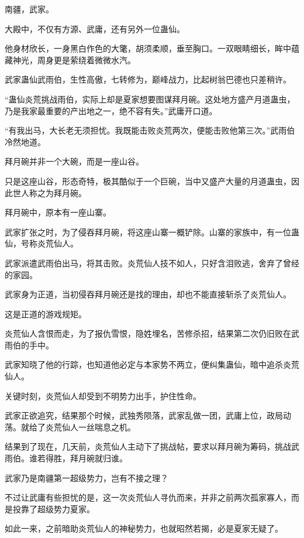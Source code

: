 
\begin{this_body}

南疆，武家。

大殿中，不仅有方源、武庸，还有另外一位蛊仙。

他身材欣长，一身黑白作色的大氅，胡须柔顺，垂至胸口。一双眼睛细长，眸中蕴藏神光，周身更是萦绕着微微水汽。

武家蛊仙武雨伯，生性高傲，七转修为，巅峰战力，比起树翁巴德也只差稍许。

“蛊仙炎荒挑战雨伯，实际上却是夏家想要图谋拜月碗。这处地方盛产月道蛊虫，乃是我家最重要的产出地之一，绝不容有失。”武庸开口道。

“有我出马，大长老无须担忧。我既能击败炎荒两次，便能击败他第三次。”武雨伯冷然地道。

拜月碗并非一个大碗，而是一座山谷。

只是这座山谷，形态奇特，极其酷似于一个巨碗，当中又盛产大量的月道蛊虫，因此世人称之为拜月碗。

拜月碗中，原本有一座山寨。

武家扩张之时，为了侵吞拜月碗，将这座山寨一概铲除。山寨的家族中，有一位蛊仙，号称炎荒仙人。

武家派遣武雨伯出马，将其击败。炎荒仙人技不如人，只好含泪败逃，舍弃了曾经的家园。

武家身为正道，当初侵吞拜月碗还是找的理由，却也不能直接斩杀了炎荒仙人。

这是正道的游戏规矩。

炎荒仙人含恨而走，为了报仇雪恨，隐姓埋名，苦修杀招，结果第二次仍旧败在武雨伯的手中。

武家知晓了他的行踪，也知道他必定与本家势不两立，便纠集蛊仙，暗中追杀炎荒仙人。

关键时刻，炎荒仙人却受到不明势力出手，护住性命。

武家正欲追究，结果那个时候，武独秀陨落，武家乱做一团，武庸上位，政局动荡。就给了炎荒仙人一丝喘息之机。

结果到了现在，几天前，炎荒仙人主动下了挑战帖，要求以拜月碗为筹码，挑战武雨伯。谁若得胜，拜月碗就归谁。

武家乃是南疆第一超级势力，岂有不接之理？

不过让武庸有些担忧的是，这一次炎荒仙人寻仇而来，并非之前两次孤家寡人，而是投靠了超级势力夏家。

如此一来，之前暗助炎荒仙人的神秘势力，也就昭然若揭，必是夏家无疑了。


\end{this_body}
